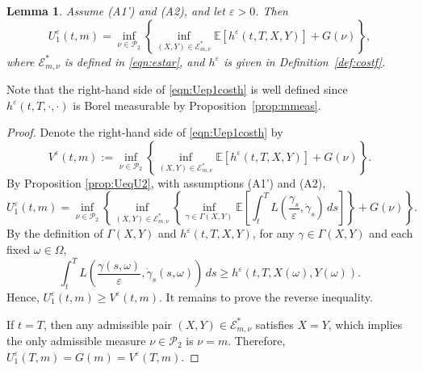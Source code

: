 \documentclass[reqno,11pt]{amsart}
\newtheorem{lemma}[theorem]{Lemma}
\numberwithin{equation}{section}
\newcommand{\e}{\varepsilon}
\newcommand{\ep}{\varepsilon}
\begin{document}
\begin{lemma}\label{lem:Uep1costh}
     Assume (A1') and (A2), and let $\e>0$. Then
\begin{equation}\label{eqn:Uep1costh}
U_1^\ep(t,m)= \inf_{\nu \in \mathcal{P}_2} \left\{
\inf_{(X, Y) \in \mathcal{E}^\ast_{m,\nu}}
\mathbb{E}[h^\e(t,T,X,Y)]+ G(\nu)\right\},
\end{equation}
where $\mathcal{E}_{m,\nu}^\ast$ is defined in \eqref{eqn:estar}, and $h^\varepsilon$ is given in Definition~\ref{def:costf}.
\end{lemma}
Note that the right-hand side of \eqref{eqn:Uep1costh} is well defined since $h^\e(t,T,\cdot,\cdot)$ is Borel measurable by Proposition~\ref{prop:mmeas}.
\begin{proof}
Denote the right-hand side of \eqref{eqn:Uep1costh} by
\[
V^\ep(t,m):=\inf_{\nu \in \mathcal{P}_2} \left\{
\inf_{(X, Y) \in \mathcal{E}^\ast_{m,\nu}}
\mathbb{E}[h^\e(t,T,X,Y)]+ G(\nu)\right\}.
\]
By Proposition \ref{prop:UeqU2}, with assumptions (A1') and (A2),
\begin{equation}\label{eqn:Uep1sim}
U_1^\e(t,m)
= \inf_{\nu \in \mathcal{P}_2} \left\{ \inf_{(X, Y) \in \mathcal{E}^\ast_{m,\nu}} \left\{ \inf_{\gamma \in \Gamma(X, Y)} \mathbb{E}\left[\int_{t}^T L\left( \frac{\gamma_s}{\e}, \dot{\gamma}_s \right)\, ds \right] \right\}+G(\nu) \right\}.
\end{equation}
By the definition of $\Gamma (X,Y)$ and $h^\ep(t,T,X,Y)$, for any $\gamma \in \Gamma(X,Y)$ and each fixed $\omega \in \Omega$,
\[
\int_{t}^T L\left( \frac{\gamma(s,\omega)}{\e}, \dot{\gamma}_s(s,\omega) \right)\, ds  \geq h^\e(t,T,X(\omega),Y(\omega)).
\]
Hence, $U^\e_1(t,m)\geq V^\e(t,m)$. It remains to prove the reverse inequality.

If $t=T$, then any admissible pair ${(X, Y) \in \mathcal{E}^\ast_{m,\nu}}$ satisfies $X=Y$, which implies the only admissible measure $\nu\in \mathcal{P}_2$ is $\nu=m$. Therefore, $U^\e_1(T,m)=G(m)=V^\e(T,m)$.


\end{proof}
\end{document}
